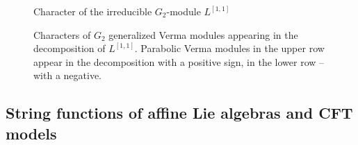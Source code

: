 \begin{figure}[h]
  \noindent{}
  \caption{Character of the irreducible $G_{2}$-module $L^{[1,1]}$}
  \label{branching-bgg}
\end{figure}
\begin{figure}[h]
  \noindent{}
  \caption{Characters of $G_{2}$ generalized Verma modules appearing in the decomposition of $L^{[1,1]}$. Parabolic Verma modules in the upper row appear in the decomposition with a positive sign, in the lower row -- with a negative.}
  \label{g2-pverma}
\end{figure}

\subsection{String functions of affine Lie algebras and CFT models}
\label{sec:string-funct-affine}

